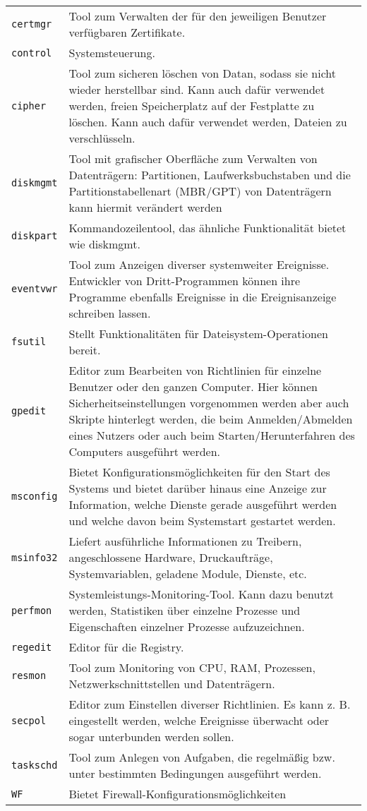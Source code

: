 \begin{tabular}{@{}p{\the\MyLen}
		@{}p{\linewidth-\the\MyLen}@{}}
	\texttt{certmgr} &  Tool zum Verwalten der für den jeweiligen Benutzer verfügbaren Zertifikate.\\
    \texttt{control} &  Systemsteuerung.\\
    \texttt{cipher} &  Tool zum sicheren löschen von Datan, sodass sie nicht wieder herstellbar sind. Kann auch dafür verwendet werden, freien Speicherplatz auf der Festplatte zu löschen. Kann auch dafür verwendet werden, Dateien zu verschlüsseln.\\
	\texttt{diskmgmt} &  Tool mit grafischer Oberfläche zum Verwalten von Datenträgern: Partitionen, Laufwerksbuchstaben und die Partitionstabellenart (MBR/GPT) von Datenträgern kann hiermit verändert werden\\
	\texttt{diskpart} &  Kommandozeilentool, das ähnliche Funktionalität bietet wie diskmgmt.\\
	\texttt{eventvwr} & Tool zum Anzeigen diverser systemweiter Ereignisse. Entwickler von Dritt-Programmen können ihre Programme ebenfalls Ereignisse in die Ereignisanzeige schreiben lassen.\\
	\texttt{fsutil} & Stellt Funktionalitäten für Dateisystem-Operationen bereit.\\
	\texttt{gpedit} & Editor zum Bearbeiten von Richtlinien für einzelne Benutzer oder den ganzen Computer. Hier können Sicherheitseinstellungen vorgenommen werden aber auch Skripte hinterlegt werden, die beim Anmelden/Abmelden eines Nutzers oder auch beim Starten/Herunterfahren des Computers ausgeführt werden.\\
	\texttt{msconfig} & Bietet Konfigurationsmöglichkeiten für den Start des Systems und bietet darüber hinaus eine Anzeige zur Information, welche Dienste gerade ausgeführt werden und welche davon beim Systemstart gestartet werden.\\
	\texttt{msinfo32} & Liefert ausführliche Informationen zu Treibern, angeschlossene Hardware, Druckaufträge, Systemvariablen, geladene Module, Dienste, etc.\\
	\texttt{perfmon} & Systemleistungs-Monitoring-Tool. Kann dazu benutzt werden, Statistiken über einzelne Prozesse und Eigenschaften einzelner Prozesse aufzuzeichnen.\\
	\texttt{regedit} & Editor für die Registry.\\
	\texttt{resmon} & Tool zum Monitoring von CPU, RAM, Prozessen, Netzwerkschnittstellen und Datenträgern.\\
	\texttt{secpol} & Editor zum Einstellen diverser Richtlinien. Es kann z. B. eingestellt werden, welche Ereignisse überwacht oder sogar unterbunden werden sollen.\\
	\texttt{taskschd} & Tool zum Anlegen von Aufgaben, die regelmäßig bzw. unter bestimmten Bedingungen ausgeführt werden.\\
	\texttt{WF} &  Bietet Firewall-Konfigurationsmöglichkeiten
	\end{tabular}
